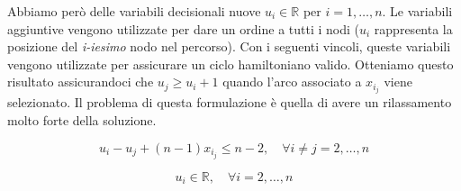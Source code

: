 Abbiamo però delle variabili decisionali nuove \begin{math}u_i \in \mathbb{R}\end{math} per \begin{math}i = 1, \dots, n\end{math}. Le variabili aggiuntive vengono utilizzate per dare un ordine a tutti i nodi (\begin{math}u_i\end{math} rappresenta la posizione del \textit{i-iesimo} nodo nel percorso). Con i seguenti vincoli, queste variabili vengono utilizzate per assicurare un ciclo hamiltoniano valido. 
Otteniamo questo risultato assicurandoci che \begin{math}u_j \ge u_i + 1\end{math} quando l'arco associato a \begin{math}x_{i_j}\end{math} viene selezionato. 
Il problema di questa formulazione è quella di avere un rilassamento molto forte della soluzione.

\[
u_i - u_j + (n-1)x_{i_j} \leq n - 2, \quad \forall i \ne j = 2, \dots, n
\]

\[
u_i \in \mathbb{R}, \quad \forall i = 2, \dots, n
\]
